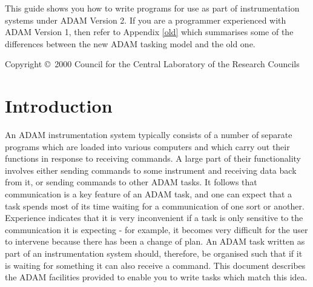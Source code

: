 \documentclass[twoside,11pt]{article}
\newcommand{\stardocinitials}  {SUN}
\newcommand{\stardoccopyright} 
{Copyright \copyright\ 2000 Council for the Central Laboratory of the Research Councils}
\newcommand{\stardocnumber}    {134.3}
\newcommand{\stardocabstract}  {
This guide shows you how to write programs for use as part of
instrumentation systems under ADAM Version 2. If you are a programmer
experienced with ADAM Version 1, then refer to Appendix \ref{old} which
summarises some of the differences between the new ADAM tasking model
and the old one. 
}
\newcommand{\stardocname}{\stardocinitials /\stardocnumber}
\newenvironment{latexonly}{}{}
\newcommand{\xlabel}[1]{}
\renewcommand{\_}{\texttt{\symbol{95}}}
\renewcommand{\thepage}{\roman{page}}
\begin{document}
\stardocabstract

\begin{latexonly}
\newpage
\vspace*{\fill}
\stardoccopyright
\end{latexonly}

  \newpage
  \begin{latexonly}
    \setlength{\parskip}{0mm}
    \tableofcontents
    \setlength{\parskip}{\medskipamount}
    \markboth{\stardocname}{\stardocname}
  \end{latexonly}

\cleardoublepage
\renewcommand{\thepage}{\arabic{page}}
\setcounter{page}{1}
\section{Introduction\xlabel{introduction}}

An ADAM instrumentation system typically consists of a number of 
separate programs which are loaded into various computers and which 
carry out their functions in response to receiving commands. A large part 
of their functionality involves either sending commands to some 
instrument and receiving data back from it, or sending commands to other 
ADAM tasks. It follows that communication is a key feature of an ADAM 
task, and one can expect that a task spends most of its time waiting for 
a communication of one sort or another. Experience indicates that it is 
very inconvenient if a task is only sensitive to the communication it is 
expecting - for example, it becomes very difficult for the user to
intervene because there has been a change of plan. An ADAM task written
as part of an instrumentation system should, therefore, be organised
such that if it is waiting for something it can also receive a command.
This document describes the ADAM facilities provided to enable you to
write tasks which match this idea. 
\end{document}
